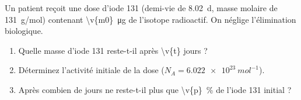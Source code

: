 Un patient reçoit une dose d'iode 131 (demi-vie de \qty{8.02}{d}, masse molaire de \qty{131}{g/mol}) contenant \qty{\v{m0}}{\micro\gram} de l'isotope radioactif. On néglige l'élimination biologique.

\begin{enumerate}[label=\alph*)]
    \item Quelle masse d'iode 131 reste-t-il après \num{\v{t}} jours ?
    \item Déterminez l'activité initiale de la dose ($N_A = \qty{6.022e23}{mol^{-1}}$).
    \item Après combien de jours ne reste-t-il plus que \qty{\v{p}}{\percent} de l'iode 131 initial ?
\end{enumerate}
